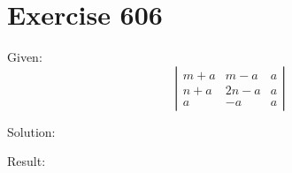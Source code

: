 \documentclass[a4paper, 10pt]{scrartcl}
\begin{document}
\section{Exercise 606}

Given:
\[
\left|
    \begin{array}{ccc}
    m + a & m - a & a\\
    n + a & 2n - a & a\\
    a & -a & a
    \end{array}
\right|
\]

Solution:

Result:
\end{document}
